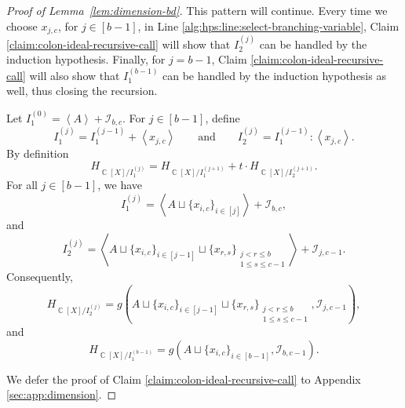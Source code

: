 \documentclass[11pt,reqno]{amsart}
\DeclareMathOperator{\C}{\mathbb{C}}
\newcommand{\suchthat}{:}
\newcommand{\ideal}[1]{\left\langle#1\right\rangle}
\theoremstyle{definition}
\numberwithin{equation}{section}
\begin{document}
\begin{proof}[Proof of Lemma~\ref{lem:dimension-bd}]
This pattern will continue. Every time we choose $x_{j, c}$, for $j \in [b-1]$, in Line \ref{alg:hps:line:select-branching-variable}, Claim \ref{claim:colon-ideal-recursive-call} will show that $I_2^{(j)}$ can be handled by the induction hypothesis. Finally, for $j = b-1$, Claim \ref{claim:colon-ideal-recursive-call} will also show that $I_1^{(b-1)}$ can be handled by the induction hypothesis as well, thus closing the recursion.

\begin{claim}[store=claimcolonidealrecursivecall]
\label{claim:colon-ideal-recursive-call}
Let $I_{1}^{(0)} = \ideal{A} + \mathcal{I}_{b, c}$. For $j \in [b-1]$, define 
\begin{equation} \label{eqn:recursive-definitions-both-i1-i2}
I_{1}^{(j)} = I_{1}^{(j-1)} + \ideal{x_{j, c}} \qquad \text{and} \qquad I_{2}^{(j)} = I_{1}^{(j-1)} \suchthat \ideal{x_{j, c}}. \end{equation}
By definition 
\begin{equation}
\label{eqn:recursive-step-onI1}
H_{\C[X] / I_1^{(j)}} = H_{\C[X] / I_1^{(j+1)}} + t\cdot H_{\C[X] /  I_2^{(j+1)}}.
\end{equation}
For all $j \in [b-1]$, we have
\begin{equation} \label{eqn:i-1-of-recursive}
I_{1}^{(j)} = \ideal{A \sqcup \{x_{i, c}\}_{i \in [j]}} + \mathcal{I}_{b, c},
\end{equation}
and 
\begin{equation} \label{eqn:i-2-of-recursive}
I_2^{(j)} = \ideal{A \sqcup \{x_{i, c}\}_{i \in [j-1]} \sqcup \{x_{r, s}\}_{\substack{j < r \le b \\ 1 \le s \le c-1}}} + \mathcal{I}_{j, c-1}.
\end{equation}
Consequently, 
\begin{equation} \label{eqn:colon-induction-hypothesis} 
H_{\C\left[X\right] / I_{2}^{(j)}} = g(A \sqcup \{x_{i, c}\}_{i \in [j-1]} \sqcup \{x_{r, s}\}_{\substack{j < r \le b \\ 1 \le s \le c-1}}, \mathcal{I}_{j, c-1}),
\end{equation} 
and
\begin{equation} \label{eqn:terminal-i1}
H_{\C\left[X\right] / I_{1}^{(b-1)}} = g(A \sqcup \{x_{i, c}\}_{i \in [b-1]}, \mathcal{I}_{b, c-1}).
\end{equation}
\end{claim}

We defer the proof of Claim \ref{claim:colon-ideal-recursive-call} to Appendix \ref{sec:app:dimension}.


\end{proof}
\end{document}
